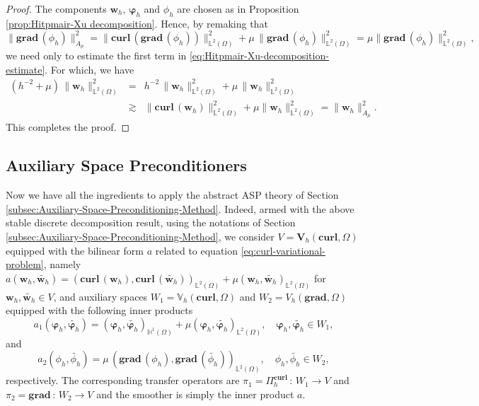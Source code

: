 \begin{proof}
The components $\bm{w}_h$, $\bm{\varphi}_h$ and $\phi_h$ are chosen as in Proposition \ref{prop:Hitpmair-Xu decomposition}. Hence, by remaking that 
$$
\|\textbf{grad}\,(\phi_h)\|_{A_\mu}^2= \|\textbf{curl} \,\left( \textbf{grad}\,(\phi_h) \right)\|_{\mathbb{L}^2(\Omega)}^2 + \mu \, \|\textbf{grad}\,(\phi_h)\|_{\mathbb{L}^2(\Omega)}^2 =\mu \|\textbf{grad}\,(\phi_h)\|_{\mathbb{L}^2(\Omega)}^2,
$$
we need only to estimate the first term in \eqref{eq:Hitpmair-Xu-decomposition-estimate}. For which, we have 
\begin{eqnarray*}
(h^{-2} + \mu) \, \|\bm{w}_h\|_{\mathbb{L}^2(\Omega)}^2 &=& h^{-2}\, \|\bm{w}_h\|_{\mathbb{L}^2(\Omega)}^2+ \mu \, \|\bm{w}_h\|_{\mathbb{L}^2(\Omega)}^2\\
& \gtrsim & \|\textbf{curl} \,(\bm{w}_h)\|_{\mathbb{L}^2(\Omega)}^2 + \mu \|\bm{w}_h\|_{\mathbb{L}^2(\Omega)}^2 = \|\bm{w}_h\|_{A_\mu}^2.
\end{eqnarray*}
This completes the proof.
\end{proof}


\subsection{Auxiliary Space Preconditioners}\label{subsec:construction-of-ASP}
Now we have all the ingredients to apply the abstract ASP theory of Section \ref{subsec:Auxiliary-Space-Preconditioning-Method}. Indeed, armed with the above stable discrete decomposition result, using the notations of Section \ref{subsec:Auxiliary-Space-Preconditioning-Method}, we consider $V=\bm{V}_h(\textbf{curl},\Omega)$ equipped with the bilinear form $a$ related to equation \eqref{eq:curl-variational-problem}, namely $a(\bm{w}_h,\widetilde{\bm{w}_h})= \left(\textbf{curl}\,(\bm{w}_h),\textbf{curl}\,(\widetilde{\bm{w}_h})\right)_{\mathbb{L}^2(\Omega)} + \mu (\bm{w}_h,\widetilde{\bm{w}_h})_{\mathbb{L}^2(\Omega)}$ for $\bm{w}_h, \widetilde{\bm{w}_h} \in V$, and auxiliary spaces $W_1= \mathbb{V}_h(\textbf{curl},\Omega)$ and $W_2=V_h(\textbf{grad},\Omega)$ equipped with the following inner products
\begin{equation*}
a_1(\bm{\varphi}_h,\widetilde{\bm{\varphi}_h})= (\bm{\varphi}_h,\widetilde{\bm{\varphi}_h})_{\mathbb{H}^1(\Omega)} + \mu (\bm{\varphi}_h,\widetilde{\bm{\varphi}_h})_{\mathbb{L}^2(\Omega)}, \quad \bm{\varphi}_h,\widetilde{\bm{\varphi}_h} \in W_1,
\end{equation*}
and
\begin{equation*}
a_2(\phi_h,\widetilde{\phi_h})= \mu \, (\textbf{grad}\,(\phi_h),\textbf{grad}\,(\widetilde{\phi_h}))_{\mathbb{L}^2(\Omega)},  \quad \phi_h,\widetilde{\phi_h} \in W_2,
\end{equation*}
respectively. The corresponding transfer operators are $\pi_1 = \Pi_h^{\textbf{curl}}\,:\, W_1 \longrightarrow V$ and $\pi_2=\textbf{grad}\,:\, W_2 \longrightarrow V$ and the smoother is simply the inner product $a$. 

